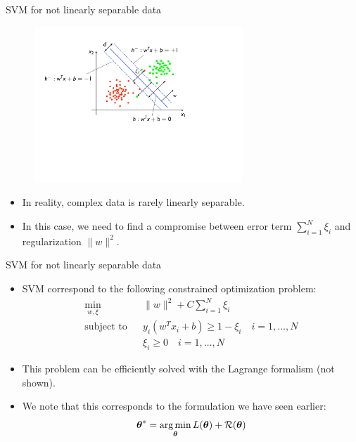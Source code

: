 \documentclass[xcolor=pdftex,dvipsnames,table]{beamer}
\begin{document}
\begin{frame}{SVM for not linearly separable data}
	\begin{figure}[htb]
		\includegraphics[width=0.7\textwidth]{../graphics/SVM3.pdf}
	\end{figure}
	\begin{itemize}
		\item In reality, complex data is rarely linearly separable. 
		\item In this case, we need to find a compromise between error term $\sum_{i=1}^{N}\xi_i$ and regularization $\|w\|^2$.
	\end{itemize}
\end{frame}

\begin{frame}{SVM for not linearly separable data}
	\begin{itemize}
		\item SVM correspond to the following constrained optimization problem:
		\begin{eqnarray*}
			\min_{w,\xi} & & \|w\|^2 + C \sum_{i=1}^{N}\xi_i\\
			\mbox{subject to} & & y_i(w^Tx_i + b) \geq 1 - \xi_i \quad i = 1, \ldots, N \\
			& & \xi_i \geq 0 \quad i = 1, \ldots, N
		\end{eqnarray*}
		\item This problem can be efficiently solved with the Lagrange formalism (not shown).
		\item We note that this corresponds to the formulation we have seen earlier: 
		\begin{equation*}
			\boldsymbol{\theta} ^{\ast} = \operatorname*{arg\,min}_{\boldsymbol{\theta}} L (\boldsymbol{\theta}) + \mathcal{R}(\boldsymbol{\theta})
		\end{equation*}
	\end{itemize}
\end{frame}
\end{document}
